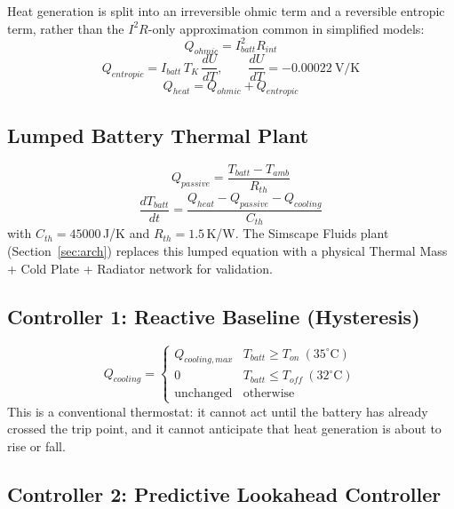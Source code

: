 \documentclass[10pt,conference]{IEEEtran}
\begin{document}
Heat generation is split into an irreversible ohmic term and a reversible entropic term, rather than the $I^2R$-only approximation common in simplified models:
\begin{equation}
Q_{ohmic} = I_{batt}^2 R_{int}
\end{equation}
\begin{equation}
Q_{entropic} = I_{batt}\,T_K\,\frac{dU}{dT}, \qquad \frac{dU}{dT} = -0.00022\ \text{V/K}
\end{equation}
\begin{equation}
Q_{heat} = Q_{ohmic} + Q_{entropic}
\end{equation}

\subsection{Lumped Battery Thermal Plant}

\begin{equation}
Q_{passive} = \frac{T_{batt}-T_{amb}}{R_{th}}
\end{equation}
\begin{equation}
\frac{dT_{batt}}{dt} = \frac{Q_{heat}-Q_{passive}-Q_{cooling}}{C_{th}}
\end{equation}
with $C_{th}=45000$\,J/K and $R_{th}=1.5$\,K/W. The Simscape Fluids plant (Section~\ref{sec:arch}) replaces this lumped equation with a physical Thermal Mass + Cold Plate + Radiator network for validation.

\subsection{Controller 1: Reactive Baseline (Hysteresis)}

\begin{equation}
Q_{cooling} = \begin{cases}
Q_{cooling,max} & T_{batt}\ge T_{on}\ (35^{\circ}\text{C}) \\
0 & T_{batt}\le T_{off}\ (32^{\circ}\text{C}) \\
\text{unchanged} & \text{otherwise}
\end{cases}
\end{equation}
This is a conventional thermostat: it cannot act until the battery has already crossed the trip point, and it cannot anticipate that heat generation is about to rise or fall.

\subsection{Controller 2: Predictive Lookahead Controller}
\end{document}
